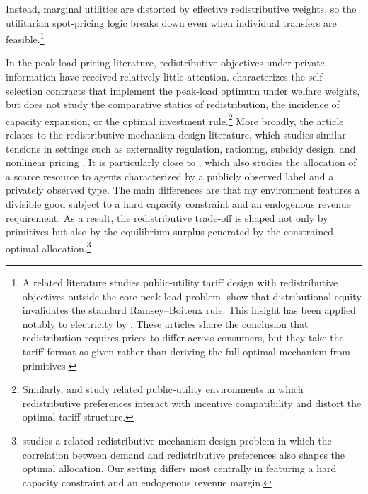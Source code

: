 \documentclass{class}
\begin{document}
Instead, marginal utilities are distorted by effective redistributive weights, so the utilitarian spot-pricing logic breaks down even when individual transfers are feasible.\footnote{A related literature studies public-utility tariff design with redistributive objectives outside the core peak-load problem. \cite{Feldsteina,Feldsteinb} show that distributional equity invalidates the standard Ramsey--Boiteux rule. This insight has been applied notably to electricity by \cite{Levinson2022,Feger2022}. These articles share the conclusion that redistribution requires prices to differ across consumers, but they take the tariff format as given rather than deriving the full optimal mechanism from primitives.}

In the peak-load pricing literature, redistributive objectives under private information have received relatively little attention. \cite{spulber1992capacity} characterizes the self-selection contracts that implement the peak-load optimum under welfare weights, but does not study the comparative statics of redistribution, the incidence of capacity expansion, or the optimal investment rule.\footnote{Similarly, \cite{Rasanen1997} and \cite{Martimort2020a} study related public-utility environments in which redistributive preferences interact with incentive compatibility and distort the optimal tariff structure.} More broadly, the article relates to the redistributive mechanism design literature, which studies similar tensions in settings such as externality regulation, rationing, subsidy design, and nonlinear pricing \citep{Pai2023,Gse2024,Dworczak2021,Kang2021,Kang2024,Makimattila2025,Cremer2002}. It is particularly close to \cite{akbarpour2023redistributive}, which also studies the allocation of a scarce resource to agents characterized by a publicly observed label and a privately observed type. The main differences are that my environment features a divisible good subject to a hard capacity constraint and an endogenous revenue requirement. As a result, the redistributive trade-off is shaped not only by primitives but also by the equilibrium surplus generated by the constrained-optimal allocation.\footnote{\cite{Kang2024} studies a related redistributive mechanism design problem in which the correlation between demand and redistributive preferences also shapes the optimal allocation. Our setting differs most centrally in featuring a hard capacity constraint and an endogenous revenue margin.}
\end{document}
